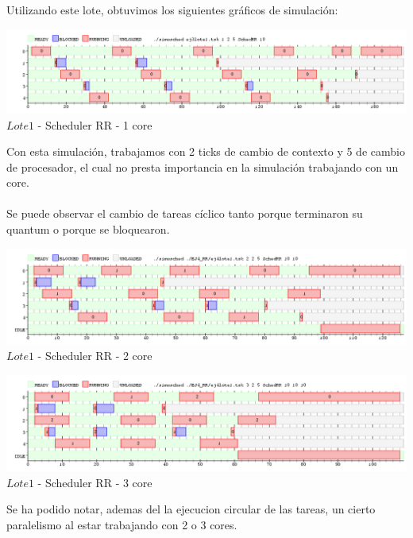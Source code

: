 Utilizando este lote, obtuvimos los siguientes gráficos de simulación:\\
\begin{center}

    
	\includegraphics[width=450pt]{./EJ4_RR/ejercicio4-1nucleo.png}
	{$Lote 1$ - Scheduler RR - 1 core}	
 
\end{center}


\indent Con esta simulación, trabajamos con 2 ticks de cambio de contexto y 5 de cambio de procesador, el cual no presta importancia
en la simulación trabajando con un core.\\
\\
\indent Se puede observar el cambio de tareas cíclico tanto porque terminaron su quantum o porque se bloquearon.\\

\begin{center}
  	\includegraphics[width=450pt]{./EJ4_RR/ejercicio4-2nucleo.png}
	  {$Lote 1$ - Scheduler RR - 2 core}	
\end{center}

\begin{center}
  	\includegraphics[width=450pt]{./EJ4_RR/ejercicio4-3nucleo.png}
	  {$Lote 1$ - Scheduler RR - 3 core}	
\end{center}

\indent Se ha podido notar, ademas del la ejecucion circular de las tareas, un cierto paralelismo al estar trabajando con
2 o 3 cores.\\

